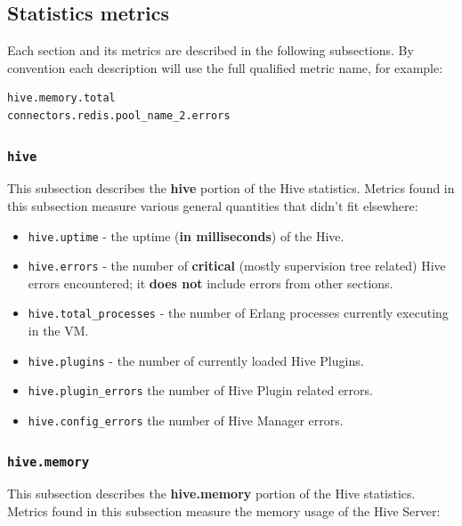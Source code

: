 \documentclass[a4paper]{article}
\begin{document}
\subsection{Statistics metrics}
\label{sec-4-2}

Each section and its metrics are described in the following subsections. By convention each description will use the full qualified metric name, for example:


\begin{verbatim}
hive.memory.total
connectors.redis.pool_name_2.errors
\end{verbatim}
\subsubsection{\texttt{hive}}
\label{sec-4-2-1}

This subsection describes the \textbf{hive} portion of the Hive statistics. Metrics found in this subsection measure various general quantities that didn't fit elsewhere:


\begin{itemize}
\item \texttt{hive.uptime} - the uptime (\textbf{in milliseconds}) of the Hive.
\item \texttt{hive.errors} - the number of \textbf{critical} (mostly supervision tree related) Hive errors encountered; it \textbf{does not} include errors from other sections.
\item \texttt{hive.total\_processes} - the number of Erlang processes currently executing in the VM.
\item \texttt{hive.plugins} - the number of currently loaded Hive Plugins.
\item \texttt{hive.plugin\_errors} the number of Hive Plugin related errors.
\item \texttt{hive.config\_errors} the number of Hive Manager errors.
\end{itemize}
\subsubsection{\texttt{hive.memory}}
\label{sec-4-2-2}

This subsection describes the \textbf{hive.memory} portion of the Hive statistics. Metrics found in this subsection measure the memory usage of the Hive Server:
\end{document}

